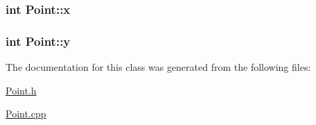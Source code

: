 \subsubsection[{\texorpdfstring{x}{x}}]{\setlength{\rightskip}{0pt plus 5cm}int Point\+::x\hspace{0.3cm}{\ttfamily [private]}}\hypertarget{classPoint_a8c779e11e694b20e0946105a9f5de842}{}\label{classPoint_a8c779e11e694b20e0946105a9f5de842}
\subsubsection[{\texorpdfstring{y}{y}}]{\setlength{\rightskip}{0pt plus 5cm}int Point\+::y\hspace{0.3cm}{\ttfamily [private]}}\hypertarget{classPoint_a2e1b5fb2b2a83571f5c0bc0f66a73cf7}{}\label{classPoint_a2e1b5fb2b2a83571f5c0bc0f66a73cf7}


The documentation for this class was generated from the following files\+:\begin{DoxyCompactItemize}
\item 
\hyperlink{Point_8h}{Point.\+h}\item 
\hyperlink{Point_8cpp}{Point.\+cpp}\end{DoxyCompactItemize}
